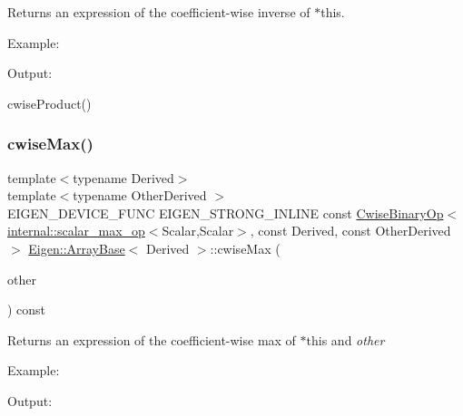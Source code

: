\begin{DoxyReturn}{Returns}
an expression of the coefficient-\/wise inverse of $\ast$this.
\end{DoxyReturn}
Example\+: 
\begin{DoxyCodeInclude}{0}
\end{DoxyCodeInclude}
 Output\+: 
\begin{DoxyVerbInclude}
\end{DoxyVerbInclude}
 cwise\+Product() \mbox{\label{class_eigen_1_1_array_base_a1f4b05bb0a90346314efc168e81b3add}} 
\subsubsection{\texorpdfstring{cwiseMax()}{cwiseMax()}\hspace{0.1cm}{\footnotesize\ttfamily [1/2]}}
{\footnotesize\ttfamily template$<$typename Derived$>$ \\
template$<$typename Other\+Derived $>$ \\
E\+I\+G\+E\+N\+\_\+\+D\+E\+V\+I\+C\+E\+\_\+\+F\+U\+NC E\+I\+G\+E\+N\+\_\+\+S\+T\+R\+O\+N\+G\+\_\+\+I\+N\+L\+I\+NE const \mbox{\hyperlink{class_eigen_1_1_cwise_binary_op}{Cwise\+Binary\+Op}}$<$\mbox{\hyperlink{struct_eigen_1_1internal_1_1scalar__max__op}{internal\+::scalar\+\_\+max\+\_\+op}}$<$Scalar,Scalar$>$, const Derived, const Other\+Derived$>$ \mbox{\hyperlink{class_eigen_1_1_array_base}{Eigen\+::\+Array\+Base}}$<$ Derived $>$\+::cwise\+Max (\begin{DoxyParamCaption}\item[{const E\+I\+G\+E\+N\+\_\+\+C\+U\+R\+R\+E\+N\+T\+\_\+\+S\+T\+O\+R\+A\+G\+E\+\_\+\+B\+A\+S\+E\+\_\+\+C\+L\+A\+SS$<$ Other\+Derived $>$ \&}]{other }\end{DoxyParamCaption}) const\hspace{0.3cm}{\ttfamily [inline]}}

\begin{DoxyReturn}{Returns}
an expression of the coefficient-\/wise max of $\ast$this and {\itshape other} 
\end{DoxyReturn}
Example\+: 
\begin{DoxyCodeInclude}{0}
\end{DoxyCodeInclude}
 Output\+: 
\begin{DoxyVerbInclude}
\end{DoxyVerbInclude}


